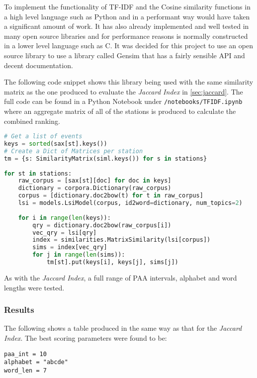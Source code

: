 \documentclass[../report.tex]{subfiles}
\begin{document}
	To implement the functionality of TF-IDF and the Cosine similarity functions in a high level language such as Python and in a performant way would have taken a significant amount of work.  It has also already implemented and well tested in many open source libraries and for performance reasons is normally constructed in a lower level language such as C.  It was decided for this project to use an open source library to use a library called Gensim \citep{rehurek_lrec} that has a fairly sensible API and decent documentation.
	
	The following code snippet shows this library being used with the same similarity matrix as the one produced to evaluate the \textit{Jaccard Index} in \cref{sec:jaccard}.  The full code can be found in a Python Notebook under \texttt{/notebooks/TFIDF.ipynb} where an aggregate matrix of all of the stations is produced to calculate the combined ranking.  
	
\begin{lstlisting}[language=Python]
# Get a list of events
keys = sorted(sax[st].keys())
# Create a Dict of Matrices per station
tm = {s: SimilarityMatrix(siml.keys()) for s in stations}
	
for st in stations:
	raw_corpus = [sax[st][doc] for doc in keys]
	dictionary = corpora.Dictionary(raw_corpus)
	corpus = [dictionary.doc2bow(t) for t in raw_corpus]
	lsi = models.LsiModel(corpus, id2word=dictionary, num_topics=2)
	
	for i in range(len(keys)):
		qry = dictionary.doc2bow(raw_corpus[i])
		vec_qry = lsi[qry]
		index = similarities.MatrixSimilarity(lsi[corpus])
		sims = index[vec_qry]
		for j in range(len(sims)):
			tm[st].put(keys[i], keys[j], sims[j])
\end{lstlisting}
	
	As with the \textit{Jaccard Index}, a full range of PAA intervals, alphabet and word lengths were tested.

	
\subsubsection{Results}

	The following shows a table produced in the same way as that for the \textit{Jaccard Index}.  The best scoring parameters were found to be:
\begin{verbatim}
paa_int = 10
alphabet = "abcde"
word_len = 7
\end{verbatim}
\end{document}
